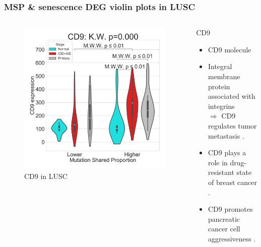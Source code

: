 \documentclass{beamer}
\begin{document}
                \begin{frame}[allowframebreaks]
                    \frametitle{MSP \& senescence DEG violin plots in LUSC}

                    \begin{columns}
                        \begin{column}{0.4 \textwidth}
                            \begin{figure}
                                \includegraphics[width=\linewidth]{figures/DEG/Violin/STAR.TPM.SQC.MSP-Median.senescence/Mutation Shared Proportion_CD9.pdf}
                                \caption{CD9 in LUSC}
                            \end{figure}
                        \end{column}
                        \begin{column}{0.55 \textwidth}
                            \begin{block}{CD9}
                                \begin{itemize}
                                    \item CD9 molecule
                                    \item Integral membrane protein associated with integrins \\
                                        $\Rightarrow$ CD9 regulates tumor metastasis \cite{CD9-01, CD9-02}.
                                    \item CD9 plays a role in drug-resistant state of breast cancer \cite{CD9-03}.
                                    \item CD9 promotes pancreatic cancer cell aggressiveness \cite{CD9-04}.
                                \end{itemize}
                            \end{block}
                        \end{column}
                    \end{columns}


\end{frame}
\end{document}
